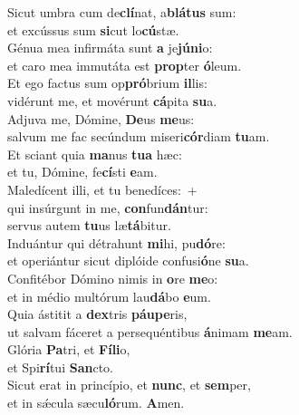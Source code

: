 \evenverse Sicut umbra cum de\textbf{clí}nat, a\textbf{blá}\textbf{tus} sum:~\*\\
\evenverse et excússus sum \textbf{si}cut lo\textbf{cú}stæ.\\
\oddverse Génua mea infirmáta sunt \textbf{a} je\textbf{jú}\textbf{ni}o:~\*\\
\oddverse et caro mea immutáta est \textbf{prop}ter \textbf{ó}leum.\\
\evenverse Et ego factus sum op\textbf{pró}brium \textbf{il}lis:~\*\\
\evenverse vidérunt me, et movérunt \textbf{cá}pita \textbf{su}a.\\
\oddverse Adjuva me, Dómine, \textbf{De}us \textbf{me}us:~\*\\
\oddverse salvum me fac secúndum miseri\textbf{cór}diam \textbf{tu}am.\\
\evenverse Et sciant quia \textbf{ma}nus \textbf{tu}\textbf{a} hæc:~\*\\
\evenverse et tu, Dómine, fe\textbf{cí}sti \textbf{e}am.\\
\oddverse Maledícent illi, et tu benedíces:~+\\
\oddverse  qui insúrgunt in me, \textbf{con}fun\textbf{dán}tur:~\*\\
\oddverse servus autem \textbf{tu}us læ\textbf{tá}bitur.\\
\evenverse Induántur qui détrahunt \textbf{mi}hi, pu\textbf{dó}re:~\*\\
\evenverse et operiántur sicut diplóide confusi\textbf{ó}ne \textbf{su}a.\\
\oddverse Confitébor Dómino nimis in \textbf{o}re \textbf{me}o:~\*\\
\oddverse et in médio multórum lau\textbf{dá}bo \textbf{e}um.\\
\evenverse Quia ástitit a \textbf{dex}tris \textbf{páu}\textbf{pe}ris,~\*\\
\evenverse ut salvam fáceret a persequéntibus \textbf{á}nimam \textbf{me}am.\\
\oddverse Glória \textbf{Pa}tri, et \textbf{Fí}\textbf{li}o,~\*\\
\oddverse et Spi\textbf{rí}tui \textbf{San}cto.\\
\evenverse Sicut erat in princípio, et \textbf{nunc}, et \textbf{sem}per,~\*\\
\evenverse et in sǽcula sæcu\textbf{ló}rum. \textbf{A}men.\\
